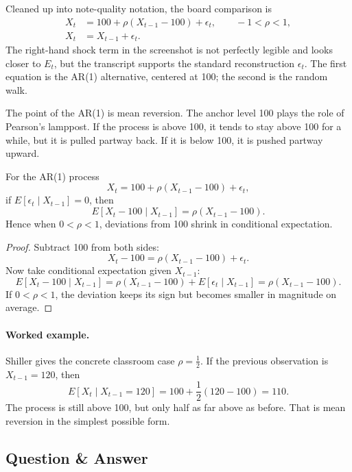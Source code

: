 Cleaned up into note-quality notation, the board comparison is
\begin{align}
X_t &= 100 + \rho(X_{t-1}-100) + \epsilon_t,
\qquad -1<\rho<1, \\
X_t &= X_{t-1} + \epsilon_t.
\end{align}
The right-hand shock term in the screenshot is not perfectly legible and looks closer to \(E_t\), but the transcript supports the standard reconstruction \(\epsilon_t\). The first equation is the AR(1) alternative, centered at 100; the second is the random walk.

The point of the AR(1) is mean reversion. The anchor level 100 plays the role of Pearson's lamppost. If the process is above 100, it tends to stay above 100 for a while, but it is pulled partway back. If it is below 100, it is pushed partway upward.

\begin{proposition}
For the AR(1) process
\[
X_t = 100 + \rho(X_{t-1}-100) + \epsilon_t,
\]
if \(E[\epsilon_t\mid X_{t-1}]=0\), then
\begin{equation}
E[X_t-100\mid X_{t-1}] = \rho(X_{t-1}-100).
\end{equation}
Hence when \(0<\rho<1\), deviations from 100 shrink in conditional expectation.
\end{proposition}

\begin{proof}
Subtract 100 from both sides:
\[
X_t-100 = \rho(X_{t-1}-100)+\epsilon_t.
\]
Now take conditional expectation given \(X_{t-1}\):
\[
E[X_t-100\mid X_{t-1}] = \rho(X_{t-1}-100) + E[\epsilon_t\mid X_{t-1}]
= \rho(X_{t-1}-100).
\]
If \(0<\rho<1\), the deviation keeps its sign but becomes smaller in magnitude on average.
\end{proof}

\paragraph{Worked example.}
Shiller gives the concrete classroom case \(\rho=\tfrac12\). If the previous observation is \(X_{t-1}=120\), then
\begin{equation}
E[X_t\mid X_{t-1}=120] = 100 + \frac12(120-100) = 110.
\end{equation}
The process is still above 100, but only half as far above as before. That is mean reversion in the simplest possible form.

\subsection{Question \& Answer}

